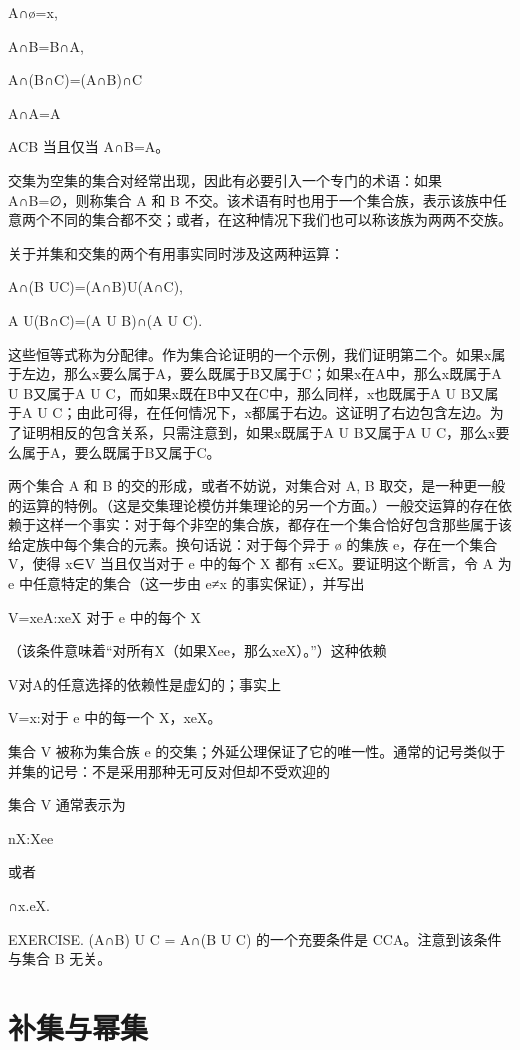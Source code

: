 \documentclass[12pt,a4paper]{ctexbook}
\theoremstyle{definition}
\theoremstyle{remark}
\begin{document}
A∩ø=x,

A∩B=B∩A,

A∩(B∩C)=(A∩B)∩C

A∩A=A

ACB 当且仅当 A∩B=A。

交集为空集的集合对经常出现，因此有必要引入一个专门的术语：如果 A∩B=∅，则称集合 A 和 B 不交。该术语有时也用于一个集合族，表示该族中任意两个不同的集合都不交；或者，在这种情况下我们也可以称该族为两两不交族。

关于并集和交集的两个有用事实同时涉及这两种运算：

A∩(B UC)=(A∩B)U(A∩C),

A U(B∩C)=(A U B)∩(A U C).

这些恒等式称为分配律。作为集合论证明的一个示例，我们证明第二个。如果x属于左边，那么x要么属于A，要么既属于B又属于C；如果x在A中，那么x既属于A U B又属于A U C，而如果x既在B中又在C中，那么同样，x也既属于A U B又属于A U C；由此可得，在任何情况下，x都属于右边。这证明了右边包含左边。为了证明相反的包含关系，只需注意到，如果x既属于A U B又属于A U C，那么x要么属于A，要么既属于B又属于C。

两个集合 A 和 B 的交的形成，或者不妨说，对集合对 {A, B} 取交，是一种更一般的运算的特例。（这是交集理论模仿并集理论的另一个方面。）一般交运算的存在依赖于这样一个事实：对于每个非空的集合族，都存在一个集合恰好包含那些属于该给定族中每个集合的元素。换句话说：对于每个异于 ø 的集族 e，存在一个集合 V，使得 x∈V 当且仅当对于 e 中的每个 X 都有 x∈X。要证明这个断言，令 A 为 e 中任意特定的集合（这一步由 e≠x 的事实保证），并写出

V={xeA:xeX 对于 e 中的每个 X}

（该条件意味着“对所有X（如果Xee，那么xeX）。”）这种依赖

V对A的任意选择的依赖性是虚幻的；事实上

V={x:对于 e 中的每一个 X，xeX}。

集合 V 被称为集合族 e 的交集；外延公理保证了它的唯一性。通常的记号类似于并集的记号：不是采用那种无可反对但却不受欢迎的

集合 V 通常表示为

n{X:Xee}

或者

∩x.eX.

EXERCISE. (A∩B) U C = A∩(B U C) 的一个充要条件是 CCA。注意到该条件与集合 B 无关。


\chapter{补集与幂集}
\end{document}
